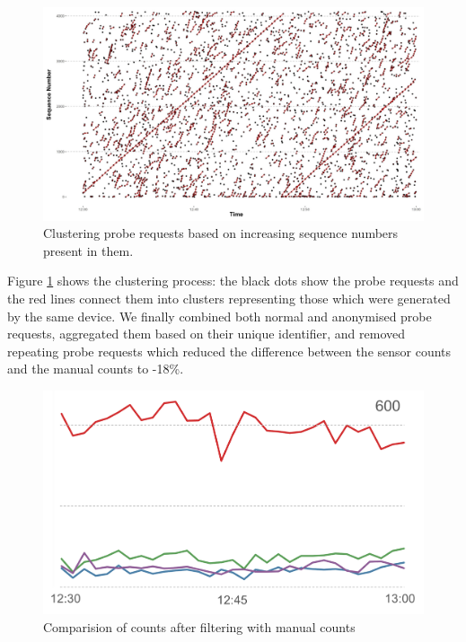 \begin{figure}
	\begin{center}
		\includegraphics [width=\linewidth,trim=4 4 4 4,clip] {images/methodology_clustering.png}
		\caption{Clustering probe requests based on increasing sequence numbers present in them.}
		\label{clustering_pilot}
	\end{center}
\end{figure}


Figure \ref{clustering_pilot} shows the clustering process: 
the black dots show the probe requests and the red lines connect them into clusters representing those which were generated by the same device.
We finally combined both normal and anonymised probe requests, aggregated them based on their unique identifier, and removed repeating probe requests which reduced the difference between the sensor counts and the manual counts to -18\%.

\begin{figure}
	\begin{center}
		\includegraphics [width=\linewidth] {images/pilot_counts_comparision.png}
		\caption{Comparision of counts after filtering with manual counts}
		\label{comparision_pilot}
	\end{center}
\end{figure}
